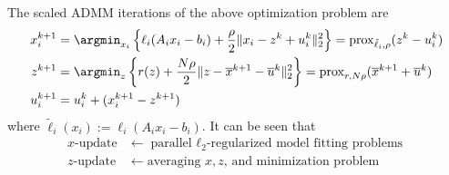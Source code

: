 The scaled ADMM iterations of the above optimization problem are
\begin{align*}
    x_i^{k+1} & = \argmin_{x_i} \left\{ \ell_i(A_ix_i-b_i) + \dfrac{\rho}{2} \lVert x_i - z^k + u_i^k \rVert_2^2 \right\} = \operatorname{prox}_{\tilde{\ell}_i,\rho}(z^k - u_i^k) \\
    z^{k+1} & = \argmin_z \left\{ r(z) + \dfrac{N\rho}{2} \lVert z - \overline{x}^{k+1} - \overline{u}^k \rVert_2^2 \right\} = \operatorname{prox}_{r,N\rho}(\overline{x}^{k+1} + \overline{u}^k) \\
    u_i^{k+1} & = u_i^k + (x_i^{k+1} - z^{k+1})
\end{align*}
where $\tilde{\ell}_i(x_i) := \ell_i(A_ix_i-b_i)$. It can be seen that
\begin{align*}
    \text{$x$-update} & \leftarrow \text{parallel $\ell_2$-regularized model fitting problems} \\
    \text{$z$-update} & \leftarrow \text{averaging $x,z$, and minimization problem} \\
\end{align*}

